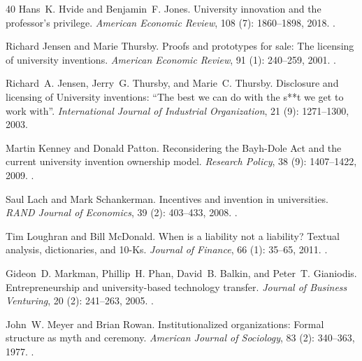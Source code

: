 \begin{thebibliography}{40}
Hans~K. Hvide and Benjamin~F. Jones.
\newblock University innovation and the professor's privilege.
\newblock \emph{American Economic Review}, 108 (7):
  1860--1898, 2018.
\newblock {}.

Richard Jensen and Marie Thursby.
\newblock Proofs and prototypes for sale: The licensing of university
  inventions.
\newblock \emph{American Economic Review}, 91 (1): 240--259,
  2001.
\newblock {}.

Richard~A. Jensen, Jerry~G. Thursby, and Marie~C. Thursby.
\newblock Disclosure and licensing of {University} inventions: ``{The} best we
  can do with the s**t we get to work with''.
\newblock \emph{International Journal of Industrial Organization}, 21
  (9): 1271--1300, 2003.

Martin Kenney and Donald Patton.
\newblock Reconsidering the {Bayh-Dole Act} and the current university
  invention ownership model.
\newblock \emph{Research Policy}, 38 (9): 1407--1422, 2009.
\newblock {}.

Saul Lach and Mark Schankerman.
\newblock Incentives and invention in universities.
\newblock \emph{RAND Journal of Economics}, 39 (2): 403--433,
  2008.
\newblock {}.

Tim Loughran and Bill McDonald.
\newblock When is a liability not a liability? {Textual} analysis,
  dictionaries, and {10-Ks}.
\newblock \emph{Journal of Finance}, 66 (1): 35--65, 2011.
\newblock {}.

Gideon~D. Markman, Phillip~H. Phan, David~B. Balkin, and Peter~T. Gianiodis.
\newblock Entrepreneurship and university-based technology transfer.
\newblock \emph{Journal of Business Venturing}, 20 (2):
  241--263, 2005.
\newblock {}.

John~W. Meyer and Brian Rowan.
\newblock Institutionalized organizations: Formal structure as myth and
  ceremony.
\newblock \emph{American Journal of Sociology}, 83 (2):
  340--363, 1977.
\newblock {}.


\end{thebibliography}
